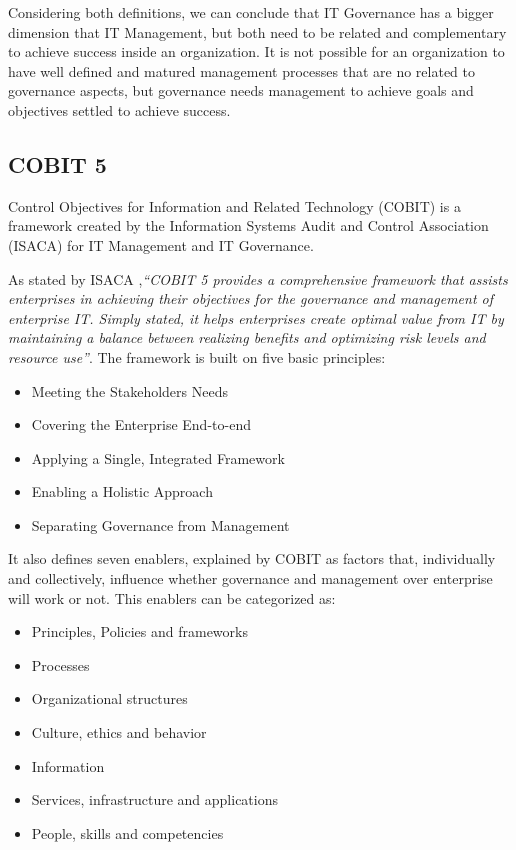  Considering both definitions, we can conclude that IT Governance has a bigger dimension that IT Management, but both need to be related and complementary to achieve success inside an organization. It is not possible for an organization to have well defined and matured management processes that are no related to governance aspects, but governance needs management to achieve goals and objectives settled to achieve success.

\subsection{COBIT 5}

Control Objectives for Information and Related Technology (COBIT) is a framework created by the Information Systems Audit and Control Association (ISACA) for IT Management and IT Governance.\par
As stated by ISACA \cite{2012cobit},\textit{``COBIT 5 provides a comprehensive framework that assists enterprises in achieving their objectives for the governance and management of enterprise IT. Simply stated, it helps enterprises create optimal value from IT by maintaining a balance between realizing benefits and optimizing risk levels and resource use''}. The framework is built on five basic principles:

\begin{itemize}
  \item Meeting the Stakeholders Needs 
  \item Covering the Enterprise End-to-end
  \item Applying a Single, Integrated Framework
  \item Enabling a Holistic Approach
  \item Separating Governance from Management
\end{itemize}


It also defines seven enablers, explained by COBIT as factors that, individually and collectively, influence whether governance and management over enterprise will work or not. This enablers can be categorized as:

\begin{itemize}
  \item Principles, Policies and frameworks 
  \item Processes 
  \item Organizational structures
  \item Culture, ethics and behavior 
  \item Information
  \item Services, infrastructure and applications
  \item People, skills and competencies
\end{itemize}

